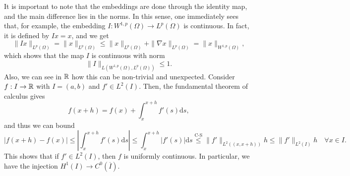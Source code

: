 It is important to note that the embeddings are done through the identity map, and the main difference lies in the norms. In this sense, one immediately sees that, for example, the embedding $I:W^{1,p}(\Omega)\to L^p(\Omega)$ is continuous. In fact, it is defined by $Ix=x$, and we get
\begin{equation*}
    \|Ix\|_{L^p(\Omega)} = \|x\|_{L^p(\Omega)} \leq \|x\|_{L^p(\Omega)} + \|\nabla x\|_{L^p(\Omega)} = \|x\|_{W^{1,p}(\Omega)},
\end{equation*}
which shows that the map $I$ is continuous with norm 
\begin{equation*}
    \|I\|_{L(W^{1,p}(\Omega), L^p(\Omega))}\leq 1.
\end{equation*}
Also, we can see in $\mathbb{R}$ how this can be non-trivial and unexpected. Consider $f:I\to \mathbb{R}$ with $I=(a,b)$ and $f'\in L^2(I)$. Then, the fundamental theorem of calculus gives
\begin{equation*}
    f(x+h) = f(x) + \int_x^{x+h}f'(s)\mathrm{d}s,
\end{equation*}
and thus we can bound
\begin{equation*}
    |f(x+h)-f(x)|\leq \left|\int_x^{x+h}f'(s)\mathrm{d}s\right|\leq \int_x^{x+h}|f'(s)|\mathrm{d}s \overset{\text{C-S}}{\leq} \|f'\|_{L^2((x,x+h))}h \leq \|f'\|_{L^2(I)}h \quad \forall x\in I.
\end{equation*}
This shows that if $f'\in L^2(I)$, then $f$ is uniformly continuous. In particular, we have the injection $H^1(I)\to C^0(\overline{I})$. 

    
    
    
